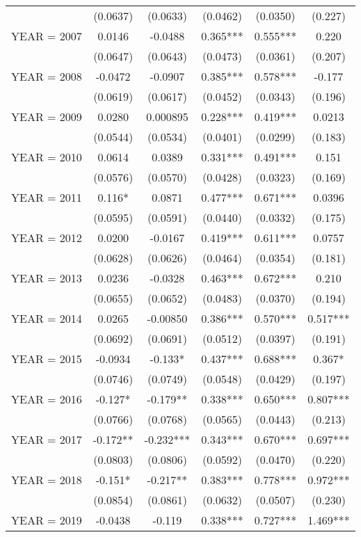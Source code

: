 \begin{tabular}{lccccc}
 & (0.0637) & (0.0633) & (0.0462) & (0.0350) & (0.227) \\
YEAR = 2007 & 0.0146 & -0.0488 & 0.365*** & 0.555*** & 0.220 \\
 & (0.0647) & (0.0643) & (0.0473) & (0.0361) & (0.207) \\
YEAR = 2008 & -0.0472 & -0.0907 & 0.385*** & 0.578*** & -0.177 \\
 & (0.0619) & (0.0617) & (0.0452) & (0.0343) & (0.196) \\
YEAR = 2009 & 0.0280 & 0.000895 & 0.228*** & 0.419*** & 0.0213 \\
 & (0.0544) & (0.0534) & (0.0401) & (0.0299) & (0.183) \\
YEAR = 2010 & 0.0614 & 0.0389 & 0.331*** & 0.491*** & 0.151 \\
 & (0.0576) & (0.0570) & (0.0428) & (0.0323) & (0.169) \\
YEAR = 2011 & 0.116* & 0.0871 & 0.477*** & 0.671*** & 0.0396 \\
 & (0.0595) & (0.0591) & (0.0440) & (0.0332) & (0.175) \\
YEAR = 2012 & 0.0200 & -0.0167 & 0.419*** & 0.611*** & 0.0757 \\
 & (0.0628) & (0.0626) & (0.0464) & (0.0354) & (0.181) \\
YEAR = 2013 & 0.0236 & -0.0328 & 0.463*** & 0.672*** & 0.210 \\
 & (0.0655) & (0.0652) & (0.0483) & (0.0370) & (0.194) \\
YEAR = 2014 & 0.0265 & -0.00850 & 0.386*** & 0.570*** & 0.517*** \\
 & (0.0692) & (0.0691) & (0.0512) & (0.0397) & (0.191) \\
YEAR = 2015 & -0.0934 & -0.133* & 0.437*** & 0.688*** & 0.367* \\
 & (0.0746) & (0.0749) & (0.0548) & (0.0429) & (0.197) \\
YEAR = 2016 & -0.127* & -0.179** & 0.338*** & 0.650*** & 0.807*** \\
 & (0.0766) & (0.0768) & (0.0565) & (0.0443) & (0.213) \\
YEAR = 2017 & -0.172** & -0.232*** & 0.343*** & 0.670*** & 0.697*** \\
 & (0.0803) & (0.0806) & (0.0592) & (0.0470) & (0.220) \\
YEAR = 2018 & -0.151* & -0.217** & 0.383*** & 0.778*** & 0.972*** \\
 & (0.0854) & (0.0861) & (0.0632) & (0.0507) & (0.230) \\
YEAR = 2019 & -0.0438 & -0.119 & 0.338*** & 0.727*** & 1.469*** \\

\end{tabular}
